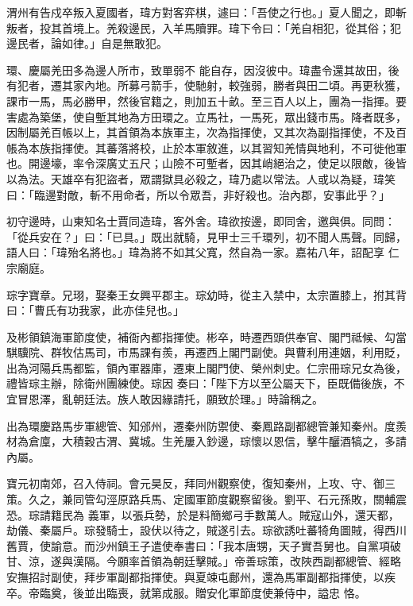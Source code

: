 \begin{pinyinscope}
 渭州有告戍卒叛入夏國者，瑋方對客弈棋，遽曰：「吾使之行也。」夏人聞之，即斬叛者，投其首境上。羌殺邊民，入羊馬贖罪。瑋下令曰：「羌自相犯，從其俗；犯邊民者，論如律。」自是無敢犯。



 環、慶屬羌田多為邊人所市，致單弱不
 能自存，因沒彼中。瑋盡令還其故田，後有犯者，遷其家內地。所募弓箭手，使馳射，較強弱，勝者與田二頃。再更秋獲，課市一馬，馬必勝甲，然後官籍之，則加五十畝。至三百人以上，團為一指揮。要害處為築堡，使自塹其地為方田環之。立馬社，一馬死，眾出錢市馬。降者既多，因制屬羌百帳以上，其首領為本族軍主，次為指揮使，又其次為副指揮使，不及百帳為本族指揮使。其蕃落將校，止於本軍敘進，以其習知羌情與地利，不可徙他軍
 也。開邊壕，率令深廣丈五尺；山險不可塹者，因其峭絕治之，使足以限敵，後皆以為法。天雄卒有犯盜者，眾謂獄具必殺之，瑋乃處以常法。人或以為疑，瑋笑曰：「臨邊對敵，斬不用命者，所以令眾吾，非好殺也。治內郡，安事此乎？」



 初守邊時，山東知名士賈同造瑋，客外舍。瑋欲按邊，即同舍，邀與俱。同問：「從兵安在？」曰：「已具。」既出就騎，見甲士三千環列，初不聞人馬聲。同歸，語人曰：「瑋殆名將也。」瑋為將不如其父寬，然自為一家。嘉祐八年，詔配享
 仁宗廟庭。



 琮字寶章。兄珝，娶秦王女興平郡主。琮幼時，從主入禁中，太宗置膝上，拊其背曰：「曹氏有功我家，此亦佳兒也。」



 及彬領鎮海軍節度使，補衙內都指揮使。彬卒，時遷西頭供奉官、閣門祗候、勾當騏驥院、群牧估馬司，市馬課有羨，再遷西上閣門副使。與曹利用連姻，利用貶，出為河陽兵馬都監，領內軍器庫，遷東上閣門使、榮州刺史。仁宗冊琮兄女為後，禮皆琮主辦，除衛州團練使。琮因
 奏曰：「陛下方以至公屬天下，臣既備後族，不宜冒恩澤，亂朝廷法。族人敢因緣請托，願致於理。」時論稱之。



 出為環慶路馬步軍總管、知邠州，遷秦州防禦使、秦鳳路副都總管兼知秦州。度羨材為倉廩，大積穀古渭、冀城。生羌屢入鈔邊，琮懷以恩信，擊牛釃酒犒之，多請內屬。



 寶元初南郊，召入侍祠。會元昊反，拜同州觀察使，復知秦州，上攻、守、御三策。久之，兼同管勾涇原路兵馬、定國軍節度觀察留後。劉平、石元孫敗，關輔震恐。琮請籍民為
 義軍，以張兵勢，於是料簡鄉弓手數萬人。賊寇山外，還天都，劫儀、秦屬戶。琮發騎士，設伏以待之，賊遂引去。琮欲誘吐蕃犄角圖賊，得西川舊賈，使諭意。而沙州鎮王子遣使奉書曰：「我本唐甥，天子實吾舅也。自黨項破甘、涼，遂與漢隔。今願率首領為朝廷擊賊。」帝善琮策，改陜西副都總管、經略安撫招討副使，拜步軍副都指揮使。與夏竦屯鄜州，還為馬軍副都指揮使，以疾卒。帝臨奠，後並出臨喪，就第成服。贈安化軍節度使兼侍中，謚忠
 恪。




\end{pinyinscope}
